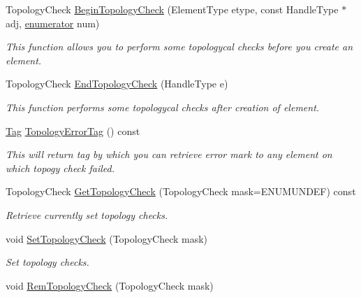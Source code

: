 \begin{DoxyCompactItemize}
\item 
Topology\-Check \hyperlink{classINMOST_1_1Mesh_a55549e9d46cd92e2f3122e1516f3c9fd}{Begin\-Topology\-Check} (Element\-Type etype, const Handle\-Type $\ast$adj, \hyperlink{classINMOST_1_1Storage_ae333dfced6fa9cfde0c8e7dcf1b0cc2b}{enumerator} num)
\begin{DoxyCompactList}\small\item\em This function allows you to perform some topologycal checks before you create an element. \end{DoxyCompactList}\item 
Topology\-Check \hyperlink{classINMOST_1_1Mesh_a1c6c26bcbe6e7a0cba093c0b8312ba04}{End\-Topology\-Check} (Handle\-Type e)
\begin{DoxyCompactList}\small\item\em This function performs some topologycal checks after creation of element. \end{DoxyCompactList}\item 
\hyperlink{classINMOST_1_1Tag}{Tag} \hyperlink{classINMOST_1_1Mesh_a72ee27b1b485c40e272f8018aa5ca0a1}{Topology\-Error\-Tag} () const 
\begin{DoxyCompactList}\small\item\em This will return tag by which you can retrieve error mark to any element on which topogy check failed. \end{DoxyCompactList}\item 
\hypertarget{classINMOST_1_1Mesh_afad6ccd8132d0aed639ef18772def9ab}{Topology\-Check \hyperlink{classINMOST_1_1Mesh_afad6ccd8132d0aed639ef18772def9ab}{Get\-Topology\-Check} (Topology\-Check mask=E\-N\-U\-M\-U\-N\-D\-E\-F) const }\label{classINMOST_1_1Mesh_afad6ccd8132d0aed639ef18772def9ab}

\begin{DoxyCompactList}\small\item\em Retrieve currently set topology checks. \end{DoxyCompactList}\item 
\hypertarget{classINMOST_1_1Mesh_af9f578239d7b369ad4b1edb69eea24d2}{void \hyperlink{classINMOST_1_1Mesh_af9f578239d7b369ad4b1edb69eea24d2}{Set\-Topology\-Check} (Topology\-Check mask)}\label{classINMOST_1_1Mesh_af9f578239d7b369ad4b1edb69eea24d2}

\begin{DoxyCompactList}\small\item\em Set topology checks. \end{DoxyCompactList}\item 
\hypertarget{classINMOST_1_1Mesh_a374a56ae3bdae9e54030c72538836c09}{void \hyperlink{classINMOST_1_1Mesh_a374a56ae3bdae9e54030c72538836c09}{Rem\-Topology\-Check} (Topology\-Check mask)}\label{classINMOST_1_1Mesh_a374a56ae3bdae9e54030c72538836c09}


\end{DoxyCompactItemize}
